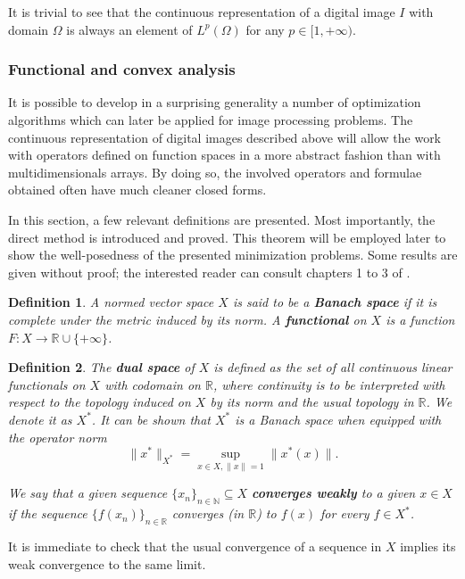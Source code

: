 \documentclass[twocolumn,twoside,a4paper,10pt]{IEEEtran}
\newtheorem{definition}{Definition}
\begin{document}
It is trivial to see that the continuous representation of a digital image \(I\) with domain \(\Omega\) is always an element of \(L^p(\Omega)\) for any \(p\in[1, +\infty)\).

\subsubsection{Functional and convex analysis} It is possible to develop in a surprising generality a number of optimization algorithms which can later be applied for image processing problems. The continuous representation of digital images described above will allow the work with operators defined on function spaces in a more abstract fashion than with multidimensionals arrays. By doing so, the involved operators and formulae obtained often have much cleaner closed forms.

In this section, a few relevant definitions are presented. Most importantly, the direct method is introduced and proved. This theorem will be employed later to show the well-posedness of the presented minimization problems. Some results are given without proof; the interested reader can consult chapters 1 to 3 of \cite{clason2024introductionnonsmoothanalysisoptimization}.

\begin{definition}
  A normed vector space \(X\) is said to be a \textbf{Banach space} if it is complete under the metric induced by its norm. A \textbf{functional} on \(X\) is a function \(F\colon X\to\mathbb{R}\cup\{+\infty\}\).
\end{definition}

\begin{definition}
  The \textbf{dual space} of \(X\) is defined as the set of all continuous linear functionals on \(X\) with codomain on \(\mathbb{R}\), where continuity is to be interpreted with respect to the topology induced on \(X\) by its norm and the usual topology in \(\mathbb{R}\). We denote it as \(X^*\). It can be shown that \(X^*\) is a Banach space when equipped with the operator norm
  \[
    \|x^*\|_{X^*} = \sup_{x\in X, \|x\|=1}\|x^*(x)\|
  .\]

  We say that a given sequence \(\{x_n\}_{n\in\mathbb{N}}\subseteq X\) \textbf{converges weakly} to a given \(x\in X\) if the sequence \(\{f(x_n)\}_{n\in\mathbb{R}}\) converges (in \(\mathbb{R}\)) to \(f(x)\) for every \(f\in X^*\).
\end{definition}

It is immediate to check that the usual convergence of a sequence in \(X\) implies its weak convergence to the same limit.
\end{document}
